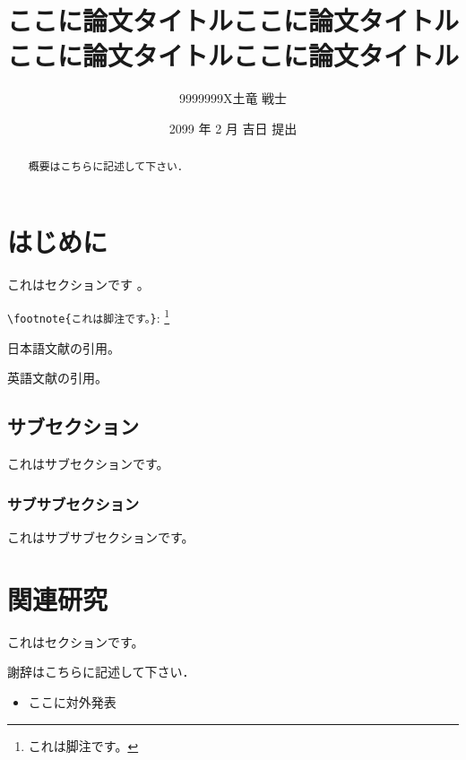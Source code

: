 \documentclass{enlp}
\title{ここに論文タイトルここに論文タイトルここに論文タイトルここに論文タイトル}
\author{9999999X\quad 土竜 戦士}
\institute{
    愛媛大学 大学院理工学研究科 \\
    理工学専攻 数理情報プログラム
}
\date{2099 年 2 月 吉日 提出}
\begin{document}
\maketitle

\begin{abstract}
概要はこちらに記述して下さい．
\end{abstract}

\tableofcontents

\section{はじめに}
これはセクションです 。

\verb|\footnote{これは脚注です。}|: \footnote{これは脚注です。}

日本語文献の引用\cite{araki-1995}。

英語文献の引用\cite{tackstrom-etal-2013-token}。

\subsection{サブセクション}
これはサブセクションです。

\subsubsection{サブサブセクション}
これはサブサブセクションです。

\section{関連研究}
これはセクションです。

\begin{acknowledgment}
謝辞はこちらに記述して下さい．
\end{acknowledgment}




\begin{publication}
\noindent
\begin{itemize}
\item ここに対外発表
\end{itemize}
\end{publication}
\end{document}
